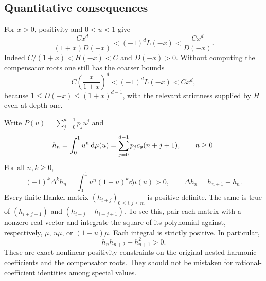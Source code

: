 \subsection{Quantitative consequences}
For $x>0$, positivity and $0<u<1$ give
\begin{equation}\label{ado:eq:negativebounds}
 \frac{Cx^d}{(1+x)D(-x)}
 <(-1)^dL(-x)<\frac{Cx^d}{D(-x)}.
\end{equation}
Indeed $C/(1+x)<H(-x)<C$ and $D(-x)>0$. Without computing the
compensator roots one still has the coarser bounds
\begin{equation}\label{ado:eq:coarsebounds}
 C\left(\frac{x}{1+x}\right)^d
 <(-1)^dL(-x)<Cx^d,
\end{equation}
because $1\le D(-x)\le(1+x)^{d-1}$, with the relevant strictness
supplied by $H$ even at depth one.

Write $P(u)=\sum_{j=0}^{d-1}p_ju^j$ and
\begin{equation}\label{ado:eq:compensatedmoments}
 h_n=\int_0^1u^n\,\mathrm d\mu(u)
     =\sum_{j=0}^{d-1}p_jc_{\boldsymbol{s}}(n+j+1),\qquad n\ge0.
\end{equation}
For all $n,k\ge0$,
\begin{equation}\label{ado:eq:completepositivity}
 (-1)^k\Delta^kh_n
 =\int_0^1u^n(1-u)^k\dd\mu(u)>0,
 \qquad \Delta h_n=h_{n+1}-h_n.
\end{equation}
Every finite Hankel matrix $(h_{i+j})_{0\le i,j\le m}$ is positive
definite. The same is true of $(h_{i+j+1})$ and
$(h_{i+j}-h_{i+j+1})$. To see this, pair each matrix with a nonzero
real vector and integrate the square of its polynomial against,
respectively, $\mu$, $u\mu$, or $(1-u)\mu$. Each integral is strictly
positive. In particular,
\[
 h_nh_{n+2}-h_{n+1}^2>0.
\]
These are exact nonlinear positivity constraints on the original nested
harmonic coefficients and the compensator roots. They should not be
mistaken for rational-coefficient identities among special values.
